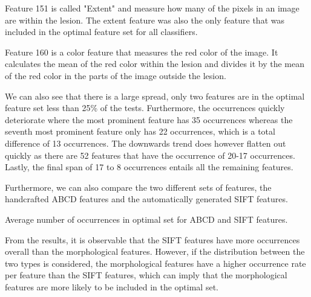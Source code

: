 \documentclass{kththesis}
\begin{document}
Feature 151 is called "Extent" and measure how many of the pixels in an image are within the lesion.
The extent feature was also the only feature that was included in the optimal feature set for all classifiers.

Feature 160 is a color feature that measures the red color of the image. It calculates the mean of the red color within the lesion and divides it by the mean of the red color in the parts of the image outside the lesion.

We can also see that there is a large spread, only two features are in the optimal feature set less than 25\% of the tests. Furthermore, the occurrences quickly deteriorate where the most prominent feature has 35 occurrences whereas the seventh most prominent feature only has 22 occurrences, which is a total difference of 13 occurrences. The downwards trend does however flatten out quickly as there are 52 features that have the occurrence of 20-17 occurrences. Lastly, the final span of 17 to 8 occurrences entails all the remaining features. 


Furthermore, we can also compare the two different sets of features, the handcrafted ABCD features and the automatically generated SIFT features.

\begin{table}[h!]
  \caption{Average number of occurrences in optimal set for ABCD and SIFT features.}
\end{table}

From the results, it is observable that the SIFT features have more occurrences overall than the morphological features. However, if the distribution between the two types is considered, the morphological features have a higher occurrence rate per feature than the SIFT features, which can imply that the morphological features are more likely to be included in the optimal set.
\end{document}
